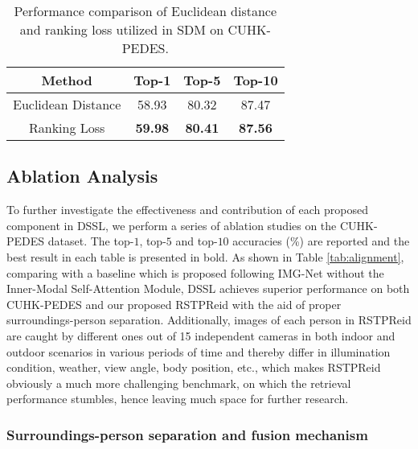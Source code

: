 \documentclass[sigconf]{acmart}
\begin{document}
\begin{table}
	\caption{Performance comparison of Euclidean distance and ranking loss utilized in SDM on CUHK-PEDES.}
	\label{tab:msesdm}
	\begin{tabular}{c|ccc}
		\toprule
		Method & Top-1 & Top-5 & Top-10 \\
		\midrule
		Euclidean Distance & 58.93 & 80.32 & 87.47 \\
		Ranking Loss & \textbf{59.98} & \textbf{80.41} & \textbf{87.56} \\
		\bottomrule
	\end{tabular}
\end{table}

\subsection{Ablation Analysis}
To further investigate the effectiveness and contribution of each proposed component in DSSL, we perform a series of ablation studies on the CUHK-PEDES dataset. The top-$1$, top-$5$ and top-$10$ accuracies (\%) are reported and the best result in each table is presented in bold. As shown in Table \ref{tab:alignment}, comparing with a baseline which is proposed following IMG-Net \cite{wang2020img} without the Inner-Modal Self-Attention Module, DSSL achieves superior performance on both CUHK-PEDES \cite{Shuang2017Person} and our proposed RSTPReid with the aid of proper surroundings-person separation. Additionally, images of each person in RSTPReid are caught by different ones out of 15 independent cameras in both indoor and outdoor scenarios in various periods of time and thereby differ in illumination condition, weather, view angle, body position, etc., which makes RSTPReid obviously a much more challenging benchmark, on which the retrieval performance stumbles, hence leaving much space for further research.

\subsubsection{Surroundings-person separation and fusion mechanism}
\label{sec:exp_SPSM+SPFM}
\end{document}
